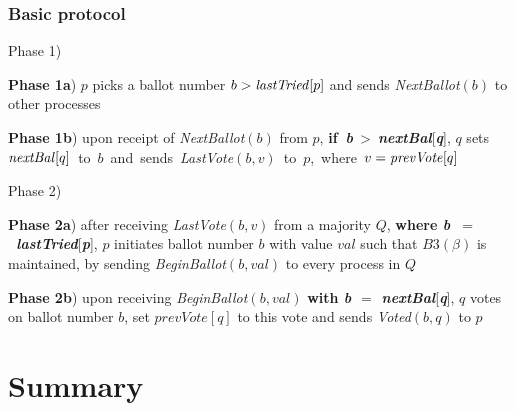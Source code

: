 \documentclass[10 pt]{beamer}
\begin{document}
\begin{frame}
\frametitle{Basic protocol}

  Phase 1)
   
  \hspace{3 mm} \textbf{Phase 1a}) $p$ picks a ballot number $b > \text{\textit{lastTried}}[p]$ and sends \textit{NextBallot}$(b)$ to other processes
   
  \hspace{3 mm} \textbf{Phase 1b}) upon receipt of \textit{NextBallot}$(b)$ from $p$, \mbox{\textbf{if \textit{b}} > \textbf{\textit{nextBal}}[\textbf{\textit{q}}],} $q$ \mbox{sets $\text{\textit{nextBal}}[q]$ to $b$ and sends \textit{LastVote}$(b, v)$ to $p$, where $v = \text{\textit{prevVote}}[q]$}
   
  \vspace{6 mm}
    
  Phase 2)
   
  \hspace{3 mm} \textbf{Phase 2a}) after receiving \textit{LastVote}$(b, v)$ from a majority $Q$, \textbf{where \mbox{\textit{b $=$ lastTried}}}[\textbf{\textit{p}}], $p$ initiates ballot  number $b$ with value $val$ such that $B3(\beta)$ is maintained, by sending \textit{BeginBallot}$(b, val)$ to every process in $Q$
      
  \hspace{3 mm} \textbf{Phase 2b}) upon receiving \textit{BeginBallot}$(b, val)$ \textbf{with \textit{b $=$ nextBal}}[\textbf{\textit{q}}], $q$ votes on ballot number $b$, set $prevVote[q]$ to this vote and sends \textit{Voted}$(b, q)$ to $p$
  
\end{frame}



\section*{Summary}
\end{document}
